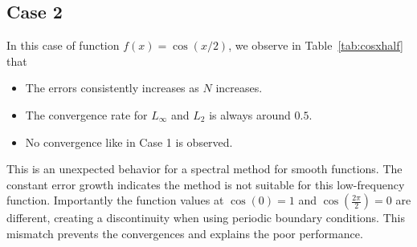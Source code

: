\subsection{Case 2}
%
%
In this case of function $f(x)=\cos(x/2)$, we observe in Table~\ref{tab:cosxhalf} that
\begin{itemize}
	\item The errors consistently increases as $N$ increases.
	\item The convergence rate for $L_\infty$ and $L_2$ is always around $0.5$.
	\item No convergence like in Case 1 is observed.
\end{itemize}
This is an unexpected behavior for a spectral method for smooth functions. The constant error growth indicates the method is not suitable for this low-frequency function. Importantly the function values at $\cos(0) = 1$ and $\cos(\frac{2 \pi}{2}) = 0$ are different, creating a discontinuity when using periodic boundary conditions. This mismatch prevents the convergences and explains the poor performance.

